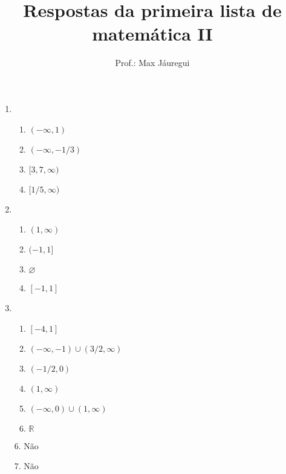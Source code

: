 \documentclass[12pt,a4paper]{article}
\title{Respostas da primeira lista de matemática II}
\author{Prof.: Max Jáuregui}
\date{}
\let\emptyset=\varnothing
\newcommand{\R}{\mathbb{R}}
\begin{document}
\maketitle

\begin{enumerate}
  \item
  \begin{enumerate}
    \item $(-\infty,1)$
    \item $(-\infty,-1/3)$
    \item $[3,7,\infty)$
    \item $[1/5,\infty)$
  \end{enumerate}
  \item
  \begin{enumerate}
    \item $(1,\infty)$
    \item $(-1,1]$
    \item $\emptyset$
    \item $[-1,1]$
  \end{enumerate}
  \item
  \begin{enumerate}
    \item $[-4,1]$
    \item $(-\infty,-1)\cup(3/2,\infty)$
    \item $(-1/2,0)$
    \item $(1,\infty)$
    \item $(-\infty,0)\cup (1,\infty)$
    \item $\R$
  \end{enumerate}
  \item[6.] Não
  \item[7.] Não
\end{enumerate}
\end{document}

